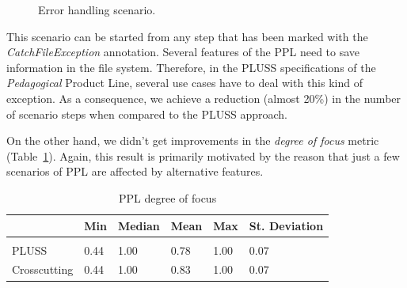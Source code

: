 \documentclass{acm_proc_article-sp}
\begin{document}
\begin{figure}[h]
\caption{Error handling scenario.}
\label{fig:error-handle}
\end{figure}

This scenario can be started from any step that has been marked with
the \emph{CatchFileException} annotation.
Several features of the PPL need to save information in the file system.
Therefore, in the PLUSS specifications of the \emph{Pedagogical}
Product Line, several use cases have to deal with this kind of exception.
As a consequence, we achieve a reduction (almost 20\%) in the number of scenario
steps when compared to the PLUSS approach.


On the other hand, we
didn't get improvements in the \emph{degree of focus} metric
(Table~\ref{tab:ppl-dof}). Again, this result is primarily motivated by the
reason that just a few scenarios of PPL are affected by alternative features. 

\begin{table}[htb] \centering
\caption{PPL degree of focus}
\label{tab:ppl-dof}
\begin{small}
\begin{tabular}{llllll} \hline
					& Min 	& Median 	& Mean 	& Max 	& St. Deviation \\ \hline \\
	PLUSS			& 0.44	& 1.00		& 0.78	& 1.00	& 0.07			\\
	Crosscutting	& 0.44  & 1.00   	& 0.83 	& 1.00 	& 0.07			\\ \hline	
\end{tabular}
\end{small}
\end{table}
\end{document}
